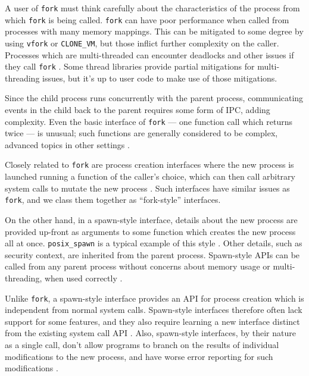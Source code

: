 \documentclass[letterpaper,twocolumn,10pt]{article}
\begin{document}
A user of \texttt{fork} must think carefully about the characteristics of the process
from which \texttt{fork} is being called.
\texttt{fork} can have poor performance when called from processes with many memory mappings\cite{forkroad}.
This can be mitigated to some degree by using \texttt{vfork} or \texttt{CLONE\_VM},
but those inflict further complexity on the caller\cite{vfork_dangerous}.
Processes which are multi-threaded can encounter deadlocks and other issues if they call \texttt{fork}
\cite{forkroad}\cite{tlpi}\cite{posix_spawn_error_pipe}.
Some thread libraries provide partial mitigations for multi-threading issues\cite{pthread_atfork},
but it's up to user code to make use of those mitigations.

Since the child process runs concurrently with the parent process,
communicating events in the child back to the parent requires some form of IPC\cite{posix_spawn_error_pipe},
adding complexity.
Even the basic interface of \texttt{fork} --- one function call which returns twice --- is unusual;
such functions are generally considered to be complex, advanced topics in other settings
\cite{callcc_fork}\cite{continuations}.

Closely related to \texttt{fork}
are process creation interfaces where the new process is launched running a function of the caller's choice,
which can then call arbitrary system calls to mutate the new process
\cite{clone}\cite{sfork}.
Such interfaces have similar issues as \texttt{fork},
and we class them together as ``fork-style'' interfaces.

On the other hand, in a spawn-style interface,
details about the new process are provided up-front as arguments to some function
which creates the new process all at once.
\texttt{posix\_spawn}\cite{posix_spawn} is a typical example of this style
\cite{chainloading}\cite{create_process}.
Other details, such as security context, are inherited from the parent process\cite{tlpi}\cite{create_process}.
Spawn-style APIs
can be called from any parent process without concerns about memory usage or multi-threading,
when used correctly
\cite{posix_spawn_error_pipe}\cite{forkroad}.

Unlike \texttt{fork}, a spawn-style interface provides an API for process creation
which is independent from normal system calls\cite{spawn_h}\cite{subprocess_run}.
Spawn-style interfaces therefore often lack support for some features,
and they also require learning a new interface distinct from the existing system call API
\cite{posix_spawn_lwn}\cite{tlpi}.
Also, spawn-style interfaces, by their nature as a single call,
don't allow programs to branch on the results of individual modifications to the new process,
and have worse error reporting for such modifications
\cite{posix_spawn}\cite{posix_spawn_error_pipe}.
\end{document}
